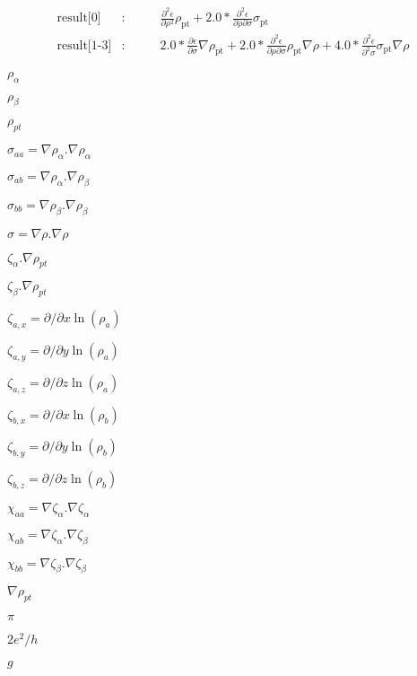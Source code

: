 \documentclass{article}
\begin{document}
\begin{eqnarray*} \mbox{result[0]} &:& \qquad \frac{\partial^2 \epsilon}{\partial \rho^2} \rho_\mathrm{pt} + 2.0 * \frac{\partial^2 \epsilon}{\partial \rho\partial\sigma}\sigma_\mathrm{pt}\\ \mbox{result[1-3]} &:& \qquad 2.0 * \frac{\partial\epsilon}{\partial\sigma}\nabla\rho_\mathrm{pt} + 2.0 * \frac{\partial^2\epsilon}{\partial\rho\partial\sigma} \rho_\mathrm{pt}\nabla\rho + 4.0 * \frac{\partial^2\epsilon}{\partial^2\sigma} \sigma_\mathrm{pt}\nabla\rho \end{eqnarray*}
\pagebreak

$ \rho_\alpha $
\pagebreak

$ \rho_\beta $
\pagebreak

$ \rho_{pt} $
\pagebreak

$ \sigma_{aa} = \nabla \rho_{\alpha}.\nabla \rho_{\alpha} $
\pagebreak

$ \sigma_{ab} = \nabla \rho_{\alpha}.\nabla \rho_{\beta} $
\pagebreak

$ \sigma_{bb} = \nabla \rho_{\beta}.\nabla \rho_{\beta} $
\pagebreak

$ \sigma = \nabla \rho.\nabla \rho $
\pagebreak

$ \zeta_{\alpha}.\nabla\rho_{pt} $
\pagebreak

$ \zeta_{\beta}.\nabla\rho_{pt} $
\pagebreak

$ \zeta_{a,x}=\partial/{\partial x} \ln(\rho_a) $
\pagebreak

$ \zeta_{a,y}=\partial/{\partial y} \ln(\rho_a) $
\pagebreak

$ \zeta_{a,z}=\partial/{\partial z} \ln(\rho_a) $
\pagebreak

$ \zeta_{b,x} = \partial/{\partial x} \ln(\rho_b) $
\pagebreak

$ \zeta_{b,y} = \partial/{\partial y} \ln(\rho_b) $
\pagebreak

$ \zeta_{b,z} = \partial/{\partial z} \ln(\rho_b) $
\pagebreak

$ \chi_{aa} = \nabla \zeta_{\alpha}.\nabla \zeta_{\alpha} $
\pagebreak

$ \chi_{ab} = \nabla \zeta_{\alpha}.\nabla \zeta_{\beta} $
\pagebreak

$ \chi_{bb} = \nabla \zeta_{\beta}.\nabla \zeta_{\beta} $
\pagebreak

$ \nabla\rho_{pt}$
\pagebreak

$\pi$
\pagebreak

$ 2e^2/h $
\pagebreak

$ g $
\pagebreak
\end{document}
